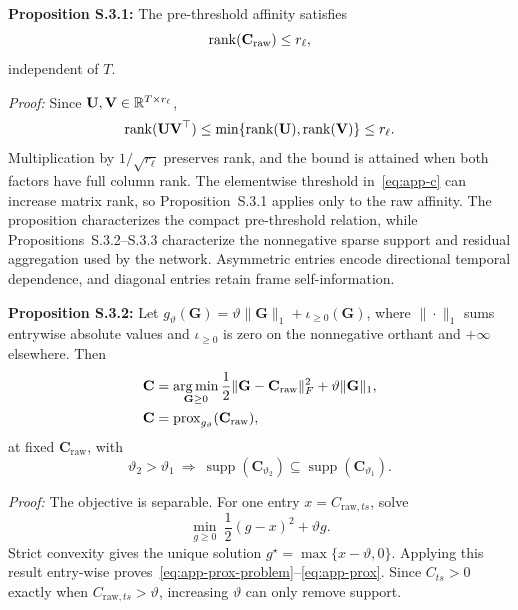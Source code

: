 \textbf{Proposition S.3.1:} The pre-threshold affinity satisfies
\begin{equation}
\operatorname{rank}(\mathbf C_{\mathrm{raw}})\leq r_\ell,
\label{eq:app-rank}
\end{equation}
independent of \(T\).

\emph{Proof:} Since \(\mathbf U,\mathbf V\in\mathbb{R}^{T\times r_\ell}\),
\begin{equation*}
\operatorname{rank}(\mathbf U\mathbf V^\top)
\leq\min\{\operatorname{rank}(\mathbf U),\operatorname{rank}(\mathbf V)\}
\leq r_\ell.
\end{equation*}
Multiplication by \(1/\sqrt{r_\ell}\) preserves rank, and the bound is attained when both factors have full column rank. The elementwise threshold in~\eqref{eq:app-c} can increase matrix rank, so Proposition~S.3.1 applies only to the raw affinity. The proposition characterizes the compact pre-threshold relation, while Propositions~S.3.2--S.3.3 characterize the nonnegative sparse support and residual aggregation used by the network. Asymmetric entries encode directional temporal dependence, and diagonal entries retain frame self-information.

\textbf{Proposition S.3.2:} Let
\(g_{\vartheta}(\mathbf G)=\vartheta\|\mathbf G\|_1+\iota_{\geq0}(\mathbf G)\), where \(\|\cdot\|_1\) sums entrywise absolute values and \(\iota_{\geq0}\) is zero on the nonnegative orthant and \(+\infty\) elsewhere. Then
\begin{align}
\mathbf C
&=\operatorname*{arg\,min}_{\mathbf G\geq0}
\frac{1}{2}\|\mathbf G-\mathbf C_{\mathrm{raw}}\|_F^2
+\vartheta\|\mathbf G\|_1,
\label{eq:app-prox-problem}\\
\mathbf C&=\operatorname{prox}_{g_{\vartheta}}(\mathbf C_{\mathrm{raw}}),
\label{eq:app-prox}
\end{align}
at fixed \(\mathbf C_{\mathrm{raw}}\), with
\begin{equation}
\vartheta_2>\vartheta_1
\ \Longrightarrow\
\operatorname{supp}(\mathbf C_{\vartheta_2})
\subseteq\operatorname{supp}(\mathbf C_{\vartheta_1}).
\label{eq:app-support}
\end{equation}

\emph{Proof:} The objective is separable. For one entry \(x=C_{\mathrm{raw},ts}\), solve
\begin{equation*}
\min_{g\geq0}\ \frac12(g-x)^2+\vartheta g.
\end{equation*}
Strict convexity gives the unique solution
\(g^\star=\max\{x-\vartheta,0\}\). Applying this result entry-wise proves~\eqref{eq:app-prox-problem}--\eqref{eq:app-prox}. Since \(C_{ts}>0\) exactly when \(C_{\mathrm{raw},ts}>\vartheta\), increasing \(\vartheta\) can only remove support.

